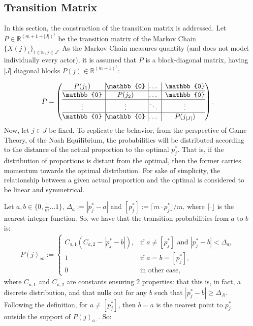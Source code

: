 \documentclass{article}
\begin{document}
\subsection{Transition Matrix}
In this section, the construction of the transition matrix is addressed.
Let $P \in \mathbb{R}^{(m+1+|J|)^2}$ be the transition matrix of the Markov Chain $\{X(j)_t\}_{t \in \mathds{N}, j \in J}$. As the Markov Chain measures quantity (and does not model individually every actor), it is assumed that $P$ is a block-diagonal matrix, having $|J|$ diagonal blocks $P(j) \in \mathbb{R}^{(m+1)^2}$:\par
\begin{align*}
	P =
	\left( \begin{array}{@{}c|@{}c|@{}c|c@{}}
		P(j_1) & \mathbb{0} & \dots & \mathbb{0}\\
		\hline
		\mathbb{0} & P(j_2) & \dots & \mathbb{0}\\
		\hline
		\vdots & \vdots & \ddots & \vdots\\
		\hline
		\mathbb{0} & \mathbb{0} & \dots & P(j_{|J|})\\
	\end{array}	\right).
\end{align*}
Now, let $j \in J$ be fixed. To replicate the behavior, from the perspective of Game Theory, of the Nash Equilibrium, the probabilities will be distributed according to the distance of the actual proportion to the optimal $p^*_j$. That is, if the distribution of proportions is distant from the optimal, then the former carries momentum towards the optimal distribution. For sake of simplicity, the relationship between a given actual proportion and the optimal is considered to be linear and symmetrical.\par
Let $a,b \in \{0,\frac{1}{m} \dots 1\}$, $\Delta_a := |p^*_j - a|$ and $[p^*_j] := \lceil m\cdot p^*_j\rfloor/m$, where $\lceil\cdot \rfloor$ is the nearest-integer function. So, we have that the transition probabilities from $a$ to $b$ is:
\begin{align*}
	P(j)_{ab} := \begin{cases}
		C_{a,1}(C_{a,2} - |p^*_j - b|), & \text{if } a \not = [p^*_j] \text{ and } |p^*_j - b| < \Delta_a,\\
		1 & \text{if } a = b = [p^*_j],\\
		0 & \text{in other case},
	\end{cases}
\end{align*}
where $C_{a,1}$ and $C_{a,2}$ are constants ensuring 2 properties: that this is, in fact, a discrete distribution, and that nulls out for any $b$ such that $|p^*_j - b| \geq \Delta_A$. Following the definition, for $a \not= [p^*_j]$, then $b = a$ is the nearest point to $p^*_j$ outside the support of $P(j)_{a \cdot}$. So:\par
\end{document}
